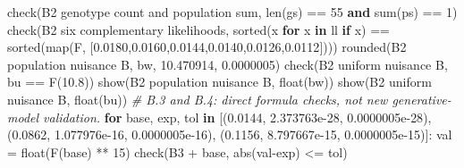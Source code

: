 \documentclass[
]{article}
\newenvironment{Shaded}{}{}
\newcommand{\BuiltInTok}[1]{\textcolor[rgb]{0.00,0.50,0.00}{#1}}
\newcommand{\CommentTok}[1]{\textcolor[rgb]{0.38,0.63,0.69}{\textit{#1}}}
\newcommand{\ControlFlowTok}[1]{\textcolor[rgb]{0.00,0.44,0.13}{\textbf{#1}}}
\newcommand{\DecValTok}[1]{\textcolor[rgb]{0.25,0.63,0.44}{#1}}
\newcommand{\FloatTok}[1]{\textcolor[rgb]{0.25,0.63,0.44}{#1}}
\newcommand{\KeywordTok}[1]{\textcolor[rgb]{0.00,0.44,0.13}{\textbf{#1}}}
\newcommand{\NormalTok}[1]{#1}
\newcommand{\OperatorTok}[1]{\textcolor[rgb]{0.40,0.40,0.40}{#1}}
\newcommand{\StringTok}[1]{\textcolor[rgb]{0.25,0.44,0.63}{#1}}
\begin{document}
\begin{Shaded}
\begin{Highlighting}[]
\NormalTok{    check(}\StringTok{\textquotesingle{}B2 genotype count and population sum\textquotesingle{}}\NormalTok{, }\BuiltInTok{len}\NormalTok{(gs) }\OperatorTok{==} \DecValTok{55} \KeywordTok{and} \BuiltInTok{sum}\NormalTok{(ps) }\OperatorTok{==} \DecValTok{1}\NormalTok{)}
\NormalTok{    check(}\StringTok{\textquotesingle{}B2 six complementary likelihoods\textquotesingle{}}\NormalTok{, }\BuiltInTok{sorted}\NormalTok{(x }\ControlFlowTok{for}\NormalTok{ x }\KeywordTok{in}\NormalTok{ ll }\ControlFlowTok{if}\NormalTok{ x) }\OperatorTok{==}
          \BuiltInTok{sorted}\NormalTok{(}\BuiltInTok{map}\NormalTok{(F, [}\StringTok{\textquotesingle{}0.0180\textquotesingle{}}\NormalTok{,}\StringTok{\textquotesingle{}0.0160\textquotesingle{}}\NormalTok{,}\StringTok{\textquotesingle{}0.0144\textquotesingle{}}\NormalTok{,}\StringTok{\textquotesingle{}0.0140\textquotesingle{}}\NormalTok{,}\StringTok{\textquotesingle{}0.0126\textquotesingle{}}\NormalTok{,}\StringTok{\textquotesingle{}0.0112\textquotesingle{}}\NormalTok{])))}
\NormalTok{    rounded(}\StringTok{\textquotesingle{}B2 population nuisance B\textquotesingle{}}\NormalTok{, bw, }\FloatTok{10.470914}\NormalTok{, }\FloatTok{0.0000005}\NormalTok{)}
\NormalTok{    check(}\StringTok{\textquotesingle{}B2 uniform nuisance B\textquotesingle{}}\NormalTok{, bu }\OperatorTok{==}\NormalTok{ F(}\StringTok{\textquotesingle{}10.8\textquotesingle{}}\NormalTok{))}
\NormalTok{    show(}\StringTok{\textquotesingle{}B2 population nuisance B\textquotesingle{}}\NormalTok{, }\BuiltInTok{float}\NormalTok{(bw))}
\NormalTok{    show(}\StringTok{\textquotesingle{}B2 uniform nuisance B\textquotesingle{}}\NormalTok{, }\BuiltInTok{float}\NormalTok{(bu))}
    \CommentTok{\# B.3 and B.4: direct formula checks, not new generative{-}model validation.}
    \ControlFlowTok{for}\NormalTok{ base, exp, tol }\KeywordTok{in}\NormalTok{ [(}\StringTok{\textquotesingle{}0.0144\textquotesingle{}}\NormalTok{, }\FloatTok{2.373763e{-}28}\NormalTok{, }\FloatTok{0.0000005e{-}28}\NormalTok{),}
\NormalTok{                           (}\StringTok{\textquotesingle{}0.0862\textquotesingle{}}\NormalTok{, }\FloatTok{1.077976e{-}16}\NormalTok{, }\FloatTok{0.0000005e{-}16}\NormalTok{),}
\NormalTok{                           (}\StringTok{\textquotesingle{}0.1156\textquotesingle{}}\NormalTok{, }\FloatTok{8.797667e{-}15}\NormalTok{, }\FloatTok{0.0000005e{-}15}\NormalTok{)]:}
\NormalTok{        val }\OperatorTok{=} \BuiltInTok{float}\NormalTok{(F(base) }\OperatorTok{**} \DecValTok{15}\NormalTok{)}
\NormalTok{        check(}\StringTok{\textquotesingle{}B3 \textquotesingle{}} \OperatorTok{+}\NormalTok{ base, }\BuiltInTok{abs}\NormalTok{(val}\OperatorTok{{-}}\NormalTok{exp) }\OperatorTok{\textless{}=}\NormalTok{ tol)}

\end{Highlighting}
\end{Shaded}
\end{document}
